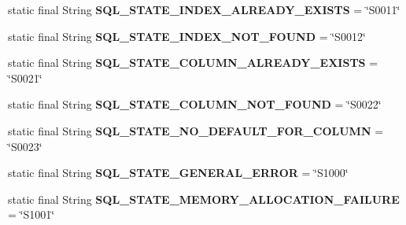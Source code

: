 \begin{DoxyCompactItemize}
static final String {\bfseries S\+Q\+L\+\_\+\+S\+T\+A\+T\+E\+\_\+\+I\+N\+D\+E\+X\+\_\+\+A\+L\+R\+E\+A\+D\+Y\+\_\+\+E\+X\+I\+S\+TS} = \char`\"{}S0011\char`\"{}
\item 
\mbox{\label{classcom_1_1mysql_1_1jdbc_1_1_s_q_l_error_a882cca8dcb0758b5e798ab3e8f504c5a}} 
static final String {\bfseries S\+Q\+L\+\_\+\+S\+T\+A\+T\+E\+\_\+\+I\+N\+D\+E\+X\+\_\+\+N\+O\+T\+\_\+\+F\+O\+U\+ND} = \char`\"{}S0012\char`\"{}
\item 
\mbox{\label{classcom_1_1mysql_1_1jdbc_1_1_s_q_l_error_aae1c7f80392b6026a8072a43a9495f66}} 
static final String {\bfseries S\+Q\+L\+\_\+\+S\+T\+A\+T\+E\+\_\+\+C\+O\+L\+U\+M\+N\+\_\+\+A\+L\+R\+E\+A\+D\+Y\+\_\+\+E\+X\+I\+S\+TS} = \char`\"{}S0021\char`\"{}
\item 
\mbox{\label{classcom_1_1mysql_1_1jdbc_1_1_s_q_l_error_a3c043450c691db313ba53c24a3268416}} 
static final String {\bfseries S\+Q\+L\+\_\+\+S\+T\+A\+T\+E\+\_\+\+C\+O\+L\+U\+M\+N\+\_\+\+N\+O\+T\+\_\+\+F\+O\+U\+ND} = \char`\"{}S0022\char`\"{}
\item 
\mbox{\label{classcom_1_1mysql_1_1jdbc_1_1_s_q_l_error_a813d4070b1afce57e9526de1f37acbbc}} 
static final String {\bfseries S\+Q\+L\+\_\+\+S\+T\+A\+T\+E\+\_\+\+N\+O\+\_\+\+D\+E\+F\+A\+U\+L\+T\+\_\+\+F\+O\+R\+\_\+\+C\+O\+L\+U\+MN} = \char`\"{}S0023\char`\"{}
\item 
\mbox{\label{classcom_1_1mysql_1_1jdbc_1_1_s_q_l_error_acf0009bb8a0a4994118606fab5e863b4}} 
static final String {\bfseries S\+Q\+L\+\_\+\+S\+T\+A\+T\+E\+\_\+\+G\+E\+N\+E\+R\+A\+L\+\_\+\+E\+R\+R\+OR} = \char`\"{}S1000\char`\"{}
\item 
\mbox{\label{classcom_1_1mysql_1_1jdbc_1_1_s_q_l_error_a38ef8c4b9ec42bc16c5640999c6c3792}} 
static final String {\bfseries S\+Q\+L\+\_\+\+S\+T\+A\+T\+E\+\_\+\+M\+E\+M\+O\+R\+Y\+\_\+\+A\+L\+L\+O\+C\+A\+T\+I\+O\+N\+\_\+\+F\+A\+I\+L\+U\+RE} = \char`\"{}S1001\char`\"{}
\item 
\mbox{\label{classcom_1_1mysql_1_1jdbc_1_1_s_q_l_error_abdec3c3ff0e3295b9c579e9ebd181cc0}} 

\end{DoxyCompactItemize}
